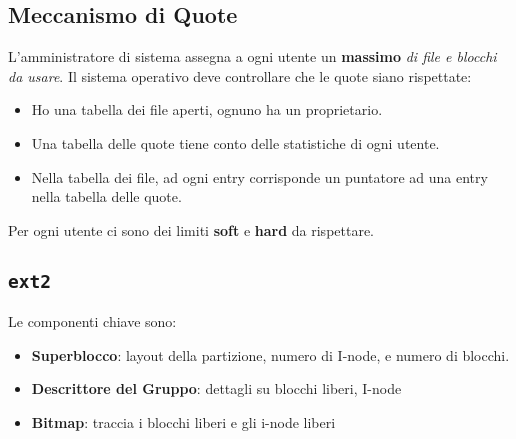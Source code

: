\subsection{Meccanismo di Quote}
L'amministratore di sistema assegna a ogni utente un \textbf{massimo} \textit{di file e blocchi da usare}.
Il sistema operativo deve controllare che le quote siano rispettate:
\begin{itemize}
    \item Ho una tabella dei file aperti, ognuno ha un proprietario.
    \item Una tabella delle quote tiene conto delle statistiche di ogni utente.
    \item Nella tabella dei file, ad ogni entry corrisponde un puntatore ad una entry nella tabella delle quote.
\end{itemize}
Per ogni utente ci sono dei limiti  \textbf{soft} e \textbf{hard} da rispettare.

\subsection{\texttt{ext2}}
Le componenti  chiave sono:
\begin{itemize}
    \item \textbf{Superblocco}: layout della partizione, numero di I-node, e numero di blocchi.
    \item \textbf{Descrittore del Gruppo}: dettagli su blocchi liberi, I-node
    \item \textbf{Bitmap}: traccia i  blocchi liberi e gli i-node liberi
\end{itemize}